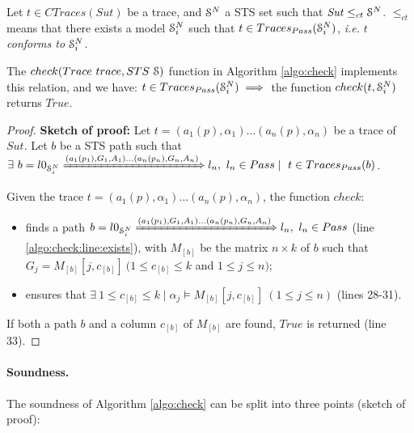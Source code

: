 \begin{proposition}
    Let $t \in CTraces(Sut)$ be a trace, and $\EuScript{S}^{N}$ a
    STS set such that $\mathit{Sut} \leq_{ct} \EuScript{S}^{N}$.
    $\leq_{ct}$ means that there exists a model
    $\EuScript{S}_i^{N}$ such that $t \in
    Traces_{Pass}(\EuScript{S}_i^{N})$, \emph{i.e.} $t$
    \emph{conforms to} $\EuScript{S}_i^{N}$.

    The $check(Trace ~trace, STS ~\EuScript{S})$ function in
    Algorithm \ref{algo:check} implements this relation, and we
    have: $t \in Traces_{Pass}(\EuScript{S}_i^{N}) \implies$ the
    function $check(t, \EuScript{S}_i^{N})$ returns $True$.

    \begin{proof}
        \textbf{Sketch of proof:} Let $t = (a_1(p), \alpha_1)
        \dots (a_n(p), \alpha_n)$ be a trace of $\mathit{Sut}$.
        Let $b$ be a STS path such that
        $\exists ~b=l0_{\EuScript{S}_i^{N}} \xRightarrow{(a_1(p_1),G_{1},A_{1}) \dots
        (a_n(p_n),G_{n},A_{n})} l_n, ~l_n \in Pass \mid ~t \in Traces_{Pass}(b)$.

        Given the trace $t = (a_1(p), \alpha_1) \dots (a_n(p),
        \alpha_n)$, the function $check$:

        \begin{itemize}
            \item finds a path $b = l0_{\EuScript{S}_i^{N}}
                \xRightarrow{(a_1(p_1),G_{1},A_{1}) \dots
                (a_n(p_n),G_{n},A_{n})} l_n, ~l_n \in Pass$ (line
                \ref{algo:check:line:exists}), with $M_{[b]}$ be
                the matrix $n \times k$ of $b$ such that $G_j =
                M_{[b]}[j, c_{[b]}] ~(1 \leq c_{[b]} \leq k$ and
                $1 \leq j \leq n)$;

            \item ensures that $\exists ~1 \leq c_{[b]} \leq k
                \mid \alpha_j \models M_{[b]}[j, c_{[b]}] ~(1
                \leq j \leq n)$ (lines 28-31). %
        \end{itemize}

        If both a path $b$ and a column $c_{[b]}$ of $M_{[b]}$
        are found, $True$ is returned (line 33).
    \end{proof}

    \label{prop:check}
\end{proposition}

\paragraph{Soundness.} The soundness of Algorithm
\ref{algo:check} can be split into three points (sketch of proof):

